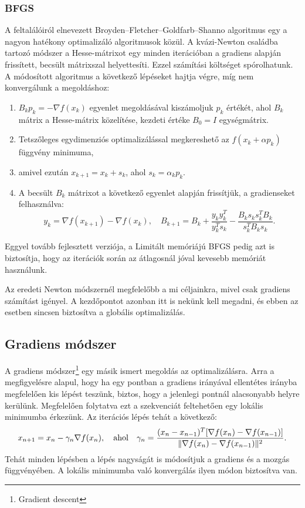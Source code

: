 \subsubsection{BFGS}
A feltalálóiról elnevezett Broyden–Fletcher–Goldfarb–Shanno algoritmus egy a nagyon hatékony optimalizáló algoritmusok közül. A kvázi-Newton családba tartozó módszer a Hesse-mátrixot egy minden iterációban a gradiens alapján frissített, becsült mátrixszal helyettesíti. Ezzel számítási költséget spórolhatunk. A módosított algoritmus a következő lépéseket hajtja végre, míg nem konvergálunk a megoldáshoz:
\begin{enumerate}
	\item $B_kp_k=-\nabla f(x_k)$ egyenlet megoldásával kiszámoljuk $p_k$ értékét, ahol $B_k$ mátrix a Hesse-mátrix közelítése, kezdeti értéke $B_0=I$ egységmátrix.
	\item Tetszőleges egydimenziós optimalizálással megkereshető az $f(x_k+\alpha p_k)$ függvény minimuma,
	\item amivel ezután $x_{k+1}=x_k+s_k$, ahol $s_k=\alpha _kp_k$.
	\item A becsült $B_k$ mátrixot a következő egyenlet alapján frissítjük, a gradienseket felhasználva:
	$$y_k=\nabla f(x_{k+1})-\nabla f(x_k), \quad B_{k+1}=B_k+\frac{y_ky_k^T}{y_k^Ts_k}-\frac{B_ks_ks_k^TB_k}{s_k^TB_ks_k}.$$
\end{enumerate}

Eggyel tovább fejlesztett verziója, a Limitált memóriájú BFGS pedig azt is biztosítja, hogy az iterációk során az átlagosnál jóval kevesebb memóriát használunk.

Az eredeti Newton módszernél megfelelőbb a mi céljainkra, mivel csak gradiens számítást igényel. A kezdőpontot azonban itt is nekünk kell megadni, és ebben az esetben sincsen biztosítva a globális optimalizálás.

\subsection{Gradiens módszer}

A gradiens módszer\footnote{Gradient descent} egy másik ismert megoldás az optimalizálásra. Arra a megfigyelésre alapul, hogy ha egy pontban a gradiens irányával ellentétes irányba megfelelően kis lépést teszünk, biztos, hogy a jelenlegi pontnál alacsonyabb helyre kerülünk. Megfelelően folytatva ezt a szekvenciát feltehetően egy lokális minimumba érkezünk. Az iterációs lépés tehát a következő:
$$x_{n+1}=x_n-\gamma _n\nabla f(x_n),\quad \textnormal{ahol}\quad \gamma _n=\frac{(x_n-x_{n-1})^T[\nabla f(x_n)-\nabla f(x_{n-1})]}{\|\nabla f(x_n)-\nabla f(x_{n-1})\|^2}.$$
Tehát minden lépésben a lépés nagyságát is módosítjuk a gradiens és a mozgás függvényében. A lokális minimumba való konvergálás ilyen módon biztosítva van. 

